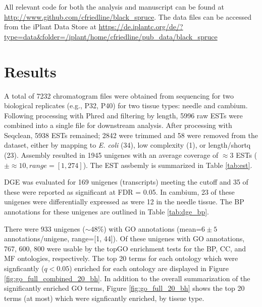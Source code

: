 \documentclass[11pt]{article}
\begin{document}
All relevant code for both the analysis and manuscript can be found at
\url{http://www.github.com/cfriedline/black_spruce}.  The data files can 
be accessed from the iPlant Data Store at 
\url{https://de.iplantc.org/de/?type=data&folder=/iplant/home/cfriedline/pub_data/black_spruce}

\section*{Results}

A total of 7232 chromatogram files were obtained from sequencing for
two biological replicates (e.g., P32, P40) for two tissue types:
needle and cambium.  Following processing with Phred and filtering by
length, 5996 raw ESTs were combined into a single file for downstream
analysis.  After processing with Seqclean, 5938 ESTs remained; 2842
were trimmed and 58 were removed from the dataset, either by mapping
to \textit{E. coli} (34), low complexity (1), or length/shortq (23).
Assembly resulted in 1945 unigenes with an average coverage of
$\approx{3}$ ESTs ($\pm \approx{10}, range=[1,274]$). The EST assbemly 
is summarized in Table \ref{tab:est}.

DGE was evaluated for 169 unigenes (transcripts) meeting the cutoff
and 35 of these were reported as significant at FDR = 0.05.  In
cambium, 23 of these unigenes were differentially expressed as were 12
in the needle tissue.  The BP annotations for these unigenes are
outlined in Table \ref{tab:dge_bp}.

There were 933 unigenes ($\sim 48\%$) with GO annotations (mean=$6 \pm
5$ annotations/unigene, range=[1, 44]). Of these unigenes with GO
annotations, 767, 600, 800 were usable by the topGO enrichment tests
for the BP, CC, and MF ontologies, respectively.  The top 20 terms for
each ontology which were signficantly ($q < 0.05$) enriched for each
ontology are displayed in Figure \ref{fig:go_full_combined_20_bh}.  In
addition to the overall summarization of the significantly enriched GO
terms, Figure \ref{fig:go_full_20_bh} shows the top 20 terms (at most) 
which were signficantly enriched, by tissue type.



\end{document}
